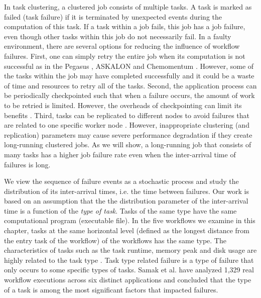 In task clustering, a clustered job consists of multiple tasks. A task is marked as failed (task failure) if it is terminated by unexpected events during the computation of this task. If a task within a job fails, this job has a job failure, even though other tasks within this job do not necessarily fail. 
In a faulty environment, there are several options for reducing the influence of workflow failures. First, one can simply retry the entire job when its computation is not successful as in the Pegasus \cite{Deelman2004}, ASKALON \cite{fahringer2007askalon} and Chemomentum \cite{schuller2008chemomentum}. However, some of the tasks within the job may have completed successfully and it could be a waste of time and resources to retry all of the tasks. Second, the application process can be periodically checkpointed such that when a failure occurs, the amount of work to be retried is limited. However, the overheads of checkpointing can limit its benefits \cite{Zhang2004}. Third, tasks can be replicated to different nodes to avoid failures that are related to one specific worker node \cite{Plankensteiner2009}. However, inappropriate clustering (and replication) parameters may cause severe performance degradation if they create long-running clustered jobs. As we will show, a long-running job that consists of many tasks has a higher job failure rate even when the inter-arrival time of failures is long. 

We view the sequence of failure events as a stochastic process and study the distribution of its inter-arrival times, i.e. the time between failures. Our work is based on an assumption that the the distribution parameter of the inter-arrival time is a function of the \emph{type of task}. Tasks of the same type have the same computational program (executable file). In the five workflows we examine in this chapter, tasks at the same horizontal level (defined as the longest distance from the entry task of the workflow) of the workflows has the same type. 
The characteristics of tasks such as the task runtime, memory peak and disk usage are highly related to the task type \cite{da2013toward, Juve2013}.
Task type related failure is a type of failure that only occurs to some specific types of tasks. Samak \cite{Samak2011} et al. have analyzed 1,329 real workflow executions across six distinct applications and concluded that the type of a task is among the most significant factors that impacted failures. 

